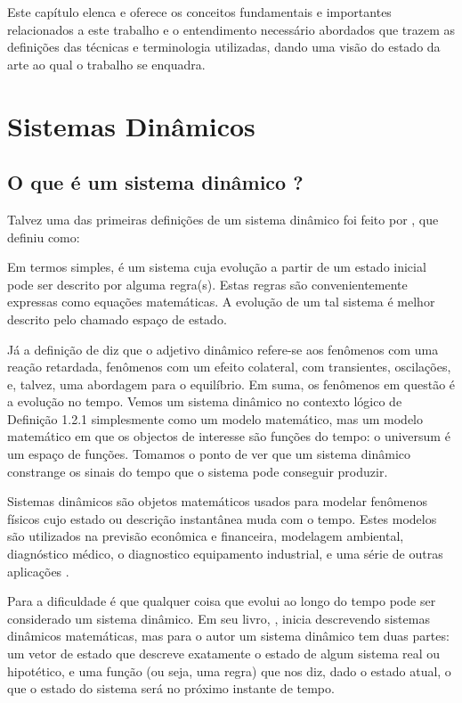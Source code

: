 Este capítulo elenca e oferece os conceitos fundamentais e importantes relacionados a este trabalho e o entendimento necessário abordados que trazem as definições das técnicas e terminologia utilizadas, dando uma visão do estado da arte ao qual o trabalho se enquadra.

\section{Sistemas Dinâmicos}
\subsection{O que é um sistema dinâmico ?}

Talvez uma das primeiras definições de um sistema dinâmico foi feito por \cite{tsonis1989} , que definiu como:

\begin{citacao}
	Em termos simples, é um sistema cuja evolução a partir de um estado inicial pode ser descrito por alguma regra(s). Estas regras são convenientemente expressas como equações matemáticas. A evolução de um tal sistema é melhor descrito pelo chamado espaço de estado.
\end{citacao}

Já a definição de \cite{willems2013} diz que o adjetivo dinâmico refere-se aos fenômenos com uma reação retardada, fenômenos com um efeito colateral, com transientes, oscilações, e, talvez, uma abordagem para o equilíbrio. Em suma, os fenômenos em questão é a evolução no tempo. Vemos um sistema dinâmico no contexto lógico de Definição 1.2.1 simplesmente como um modelo matemático, mas um modelo matemático em que os objectos de interesse são funções do tempo: o universum é um espaço de funções. Tomamos o ponto de ver que um sistema dinâmico constrange os sinais do tempo que o sistema pode conseguir produzir.


Sistemas dinâmicos são objetos matemáticos usados para modelar fenômenos físicos cujo estado ou descrição instantânea muda com o tempo. Estes modelos são utilizados na previsão econômica e financeira, modelagem ambiental, diagnóstico médico, o diagnostico equipamento industrial, e uma série de outras aplicações \cite{Dean1991}.

Para \cite{Scheinerman1995} a dificuldade é que qualquer coisa que evolui ao longo do tempo pode ser considerado um sistema dinâmico. Em seu livro, \cite{Scheinerman1995},  inicia descrevendo sistemas dinâmicos matemáticas, mas para o autor um sistema dinâmico tem duas partes: um vetor de estado que descreve exatamente o estado de algum sistema real ou hipotético, e uma função (ou seja, uma regra) que nos diz, dado o estado atual, o que o estado do sistema será no próximo instante de tempo.

